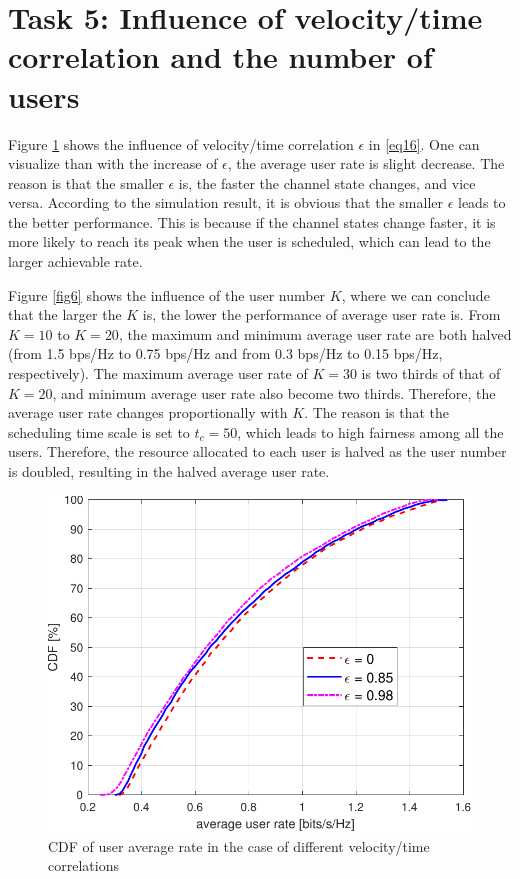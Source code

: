 \documentclass[10pt,conference]{IEEEtran}
\begin{document}
\section{Task 5: Influence of velocity/time correlation and the number of users}

Figure \ref{fig5} shows the influence of velocity/time correlation $\epsilon$ 
in \eqref{eq16}. One can visualize than with the increase of $\epsilon$, 
the average user rate is slight decrease. The reason is that the smaller $\epsilon$ is, the faster the channel state changes, 
and vice versa. According to the simulation result, it is obvious that the 
smaller $\epsilon$ leads to the better performance. This is because if the
channel states change faster, it is more likely to reach its peak when the user 
is scheduled, which can lead to the larger achievable rate.

Figure \ref{fig6} shows the influence of the user number $K$, where we can conclude
that the larger the $K$ is, the lower the performance of average user rate is. 
From $K=10$ to $K=20$, the maximum and minimum average user rate are both halved
(from 1.5 bps/Hz to 0.75 bps/Hz and from 0.3 bps/Hz to 0.15 bps/Hz, respectively).
The maximum average user rate of $K=30$ is two thirds of that of $K=20$, and
minimum average user rate also become two thirds. Therefore, the average user rate 
changes proportionally with $K$. The reason is that the scheduling time scale is set to 
$t_c=50$, which leads to high fairness among all the users. Therefore, the resource 
allocated to each user is halved as the user number is doubled, resulting in the 
halved average user rate.

\begin{figure} [htb]
    \centering
    \includegraphics[width=1\linewidth]{Fig5.pdf}
    \caption{CDF of user average rate in the case of different velocity/time correlations}
    \label{fig5}
\end{figure}
\end{document}
